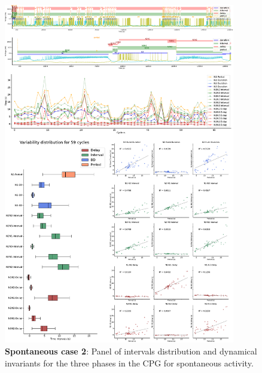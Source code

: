 \begin{figure}[htbp]
	\centering
	\includegraphics[width=0.9\textwidth]{./img/invariants/data/SUSSEX/prep3/images/3phases/panel_with_intervals.pdf}
	\caption{\textbf{Spontaneous case 2}: Panel of intervals distribution and dynamical invariants for the three phases in the CPG for spontaneous activity.}
	\label{fig:prep3 invariants}
\end{figure}

